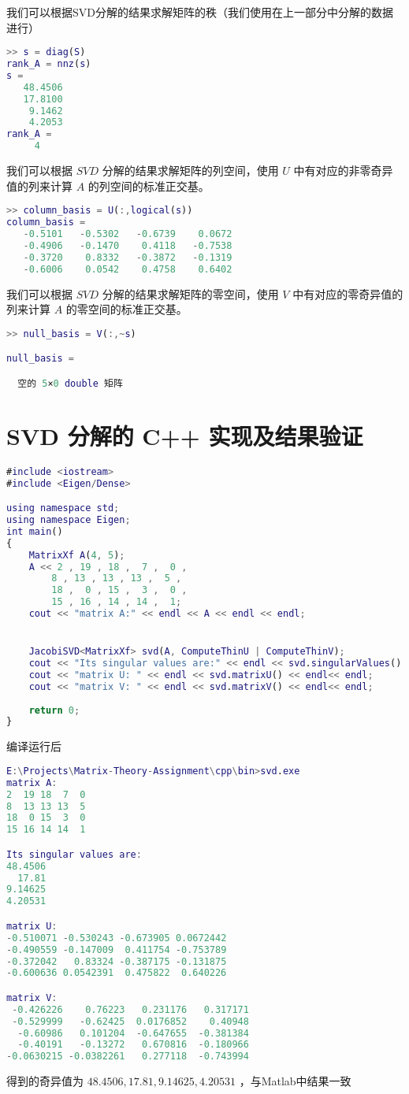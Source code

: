 我们可以根据SVD分解的结果求解矩阵的秩（我们使用在上一部分中分解的数据进行）
\begin{lstlisting}[language=Matlab]  
>> s = diag(S)
rank_A = nnz(s)
s =
   48.4506
   17.8100
    9.1462
    4.2053
rank_A =
     4
\end{lstlisting}


我们可以根据 $SVD$ 分解的结果求解矩阵的列空间，使用 $U$ 中有对应的非零奇异值的列来计算 $A$ 的列空间的标准正交基。
\begin{lstlisting}[language=Matlab]  
>> column_basis = U(:,logical(s))
column_basis =
   -0.5101   -0.5302   -0.6739    0.0672
   -0.4906   -0.1470    0.4118   -0.7538
   -0.3720    0.8332   -0.3872   -0.1319
   -0.6006    0.0542    0.4758    0.6402
\end{lstlisting}

我们可以根据 $SVD$ 分解的结果求解矩阵的零空间，使用 $V$ 中有对应的零奇异值的列来计算 $A$ 的零空间的标准正交基。
\begin{lstlisting}[language=Matlab]  
>> null_basis = V(:,~s)

null_basis =

  空的 5×0 double 矩阵
\end{lstlisting}


\section{SVD 分解的 C++ 实现及结果验证}
\begin{lstlisting}[language=Matlab]  
#include <iostream>
#include <Eigen/Dense>

using namespace std;
using namespace Eigen;
int main()
{
    MatrixXf A(4, 5);
    A << 2 , 19 , 18 ,  7 ,  0 ,
        8 , 13 , 13 , 13 ,  5 ,
        18 ,  0 , 15 ,  3 ,  0 ,
        15 , 16 , 14 , 14 ,  1;
    cout << "matrix A:" << endl << A << endl << endl;


    JacobiSVD<MatrixXf> svd(A, ComputeThinU | ComputeThinV);
    cout << "Its singular values are:" << endl << svd.singularValues() << endl<< endl;
    cout << "matrix U: " << endl << svd.matrixU() << endl<< endl;
    cout << "matrix V: " << endl << svd.matrixV() << endl<< endl;
        
    return 0;
}
\end{lstlisting}


编译运行后
\begin{lstlisting}[language=Matlab]  
E:\Projects\Matrix-Theory-Assignment\cpp\bin>svd.exe
matrix A:
2  19 18  7  0
8  13 13 13  5
18  0 15  3  0
15 16 14 14  1

Its singular values are:
48.4506
  17.81
9.14625
4.20531

matrix U:
-0.510071 -0.530243 -0.673905 0.0672442
-0.490559 -0.147009  0.411754 -0.753789
-0.372042   0.83324 -0.387175 -0.131875
-0.600636 0.0542391  0.475822  0.640226

matrix V:
 -0.426226    0.76223   0.231176   0.317171
 -0.529999   -0.62425  0.0176852    0.40948
  -0.60986   0.101204  -0.647655  -0.381384
  -0.40191   -0.13272   0.670816  -0.180966
-0.0630215 -0.0382261   0.277118  -0.743994
\end{lstlisting}

得到的奇异值为 $48.4506, 17.81, 9.14625, 4.20531$ ，与Matlab中结果一致